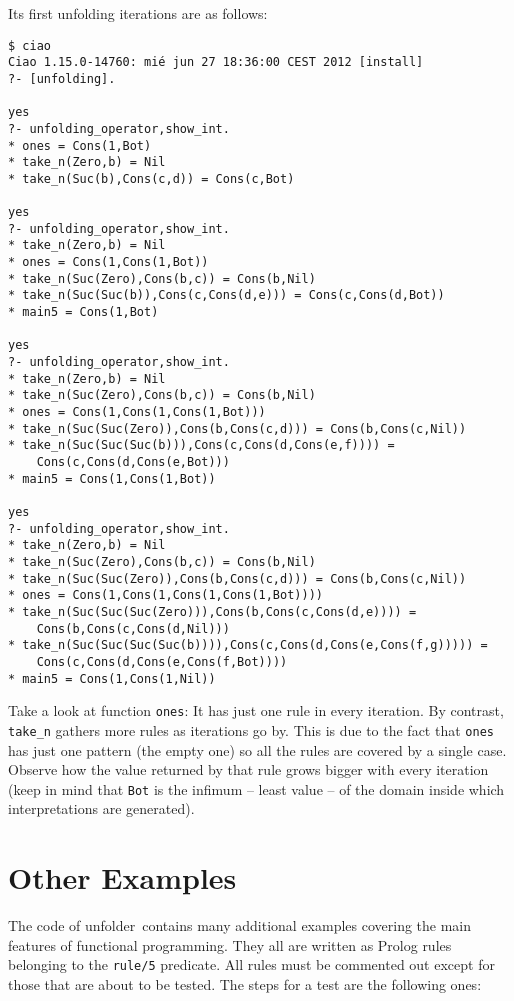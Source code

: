 \documentclass[11pt,a4paper,twoside,openright]{book}
\newcommand{\unfolder}{{\textsf{unfolder~}}}
\begin{document}
\noindent
Its first unfolding iterations are as follows:

\begin{verbatim}
$ ciao
Ciao 1.15.0-14760: mié jun 27 18:36:00 CEST 2012 [install]
?- [unfolding].

yes
?- unfolding_operator,show_int.
* ones = Cons(1,Bot)
* take_n(Zero,b) = Nil
* take_n(Suc(b),Cons(c,d)) = Cons(c,Bot)

yes
?- unfolding_operator,show_int.
* take_n(Zero,b) = Nil
* ones = Cons(1,Cons(1,Bot))
* take_n(Suc(Zero),Cons(b,c)) = Cons(b,Nil)
* take_n(Suc(Suc(b)),Cons(c,Cons(d,e))) = Cons(c,Cons(d,Bot))
* main5 = Cons(1,Bot)

yes
?- unfolding_operator,show_int.
* take_n(Zero,b) = Nil
* take_n(Suc(Zero),Cons(b,c)) = Cons(b,Nil)
* ones = Cons(1,Cons(1,Cons(1,Bot)))
* take_n(Suc(Suc(Zero)),Cons(b,Cons(c,d))) = Cons(b,Cons(c,Nil))
* take_n(Suc(Suc(Suc(b))),Cons(c,Cons(d,Cons(e,f)))) = 
    Cons(c,Cons(d,Cons(e,Bot)))
* main5 = Cons(1,Cons(1,Bot))

yes
?- unfolding_operator,show_int.
* take_n(Zero,b) = Nil
* take_n(Suc(Zero),Cons(b,c)) = Cons(b,Nil)
* take_n(Suc(Suc(Zero)),Cons(b,Cons(c,d))) = Cons(b,Cons(c,Nil))
* ones = Cons(1,Cons(1,Cons(1,Cons(1,Bot))))
* take_n(Suc(Suc(Suc(Zero))),Cons(b,Cons(c,Cons(d,e)))) = 
    Cons(b,Cons(c,Cons(d,Nil)))
* take_n(Suc(Suc(Suc(Suc(b)))),Cons(c,Cons(d,Cons(e,Cons(f,g))))) = 
    Cons(c,Cons(d,Cons(e,Cons(f,Bot))))
* main5 = Cons(1,Cons(1,Nil))
\end{verbatim}

\noindent
Take a look at function {\tt ones}: It has just one rule in every
iteration. By contrast, {\tt take\_n} gathers more rules as iterations
go by. This is due to the fact that {\tt ones} has just one pattern
(the empty one) so all the rules are covered by a single case. Observe
how the value returned by that rule grows bigger with every iteration
(keep in mind that {\tt Bot} is the infimum -- least value -- of the
domain inside which interpretations are generated).

\section{Other Examples}

The code of \unfolder contains many additional examples covering the
main features of functional programming. They all are written as
Prolog rules belonging to the {\tt rule/5} predicate. All rules must
be commented out except for those that are about to be tested. The
steps for a test are the following ones:
\end{document}
